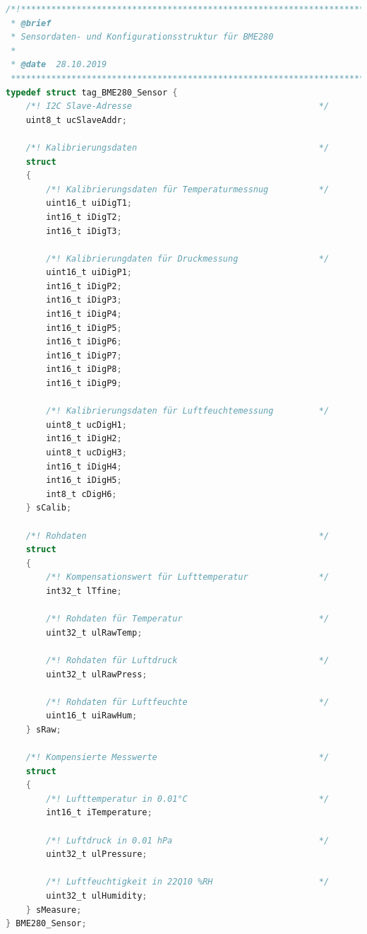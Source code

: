             \begin{lstlisting}[language=C,caption={Typdefinition für die Sensordaten-Speicherstruktur des BME280},label=lst:bme280_typedef]
/*!****************************************************************************
 * @brief
 * Sensordaten- und Konfigurationsstruktur für BME280
 *
 * @date  28.10.2019
 ******************************************************************************/
typedef struct tag_BME280_Sensor {
    /*! I2C Slave-Adresse                                     */
    uint8_t ucSlaveAddr;
    
    /*! Kalibrierungsdaten                                    */
    struct
    {
        /*! Kalibrierungsdaten für Temperaturmessnug          */
        uint16_t uiDigT1;
        int16_t iDigT2;
        int16_t iDigT3;
        
        /*! Kalibrierungdaten für Druckmessung                */
        uint16_t uiDigP1;
        int16_t iDigP2;
        int16_t iDigP3;
        int16_t iDigP4;
        int16_t iDigP5;
        int16_t iDigP6;
        int16_t iDigP7;
        int16_t iDigP8;
        int16_t iDigP9;
        
        /*! Kalibrierungsdaten für Luftfeuchtemessung         */
        uint8_t ucDigH1;
        int16_t iDigH2;
        uint8_t ucDigH3;
        int16_t iDigH4;
        int16_t iDigH5;
        int8_t cDigH6;
    } sCalib;
    
    /*! Rohdaten                                              */
    struct
    {
        /*! Kompensationswert für Lufttemperatur              */
        int32_t lTfine;
        
        /*! Rohdaten für Temperatur                           */
        uint32_t ulRawTemp;
        
        /*! Rohdaten für Luftdruck                            */
        uint32_t ulRawPress;
        
        /*! Rohdaten für Luftfeuchte                          */
        uint16_t uiRawHum;
    } sRaw;
    
    /*! Kompensierte Messwerte                                */
    struct
    {    
        /*! Lufttemperatur in 0.01°C                          */
        int16_t iTemperature;
        
        /*! Luftdruck in 0.01 hPa                             */
        uint32_t ulPressure;
        
        /*! Luftfeuchtigkeit in 22Q10 %RH                     */
        uint32_t ulHumidity;
    } sMeasure;
} BME280_Sensor;
            \end{lstlisting}
    
